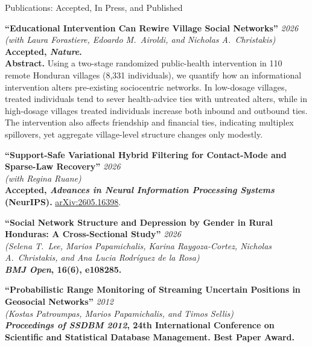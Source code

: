 \documentclass{resume}
\newcommand*{\myhref}[2]{\href{#1}{#2}}
\newcommand{\pubtitle}[1]{\textbf{``#1''}}
\begin{document}
\begin{rSection}{Publications: Accepted, In Press, and Published}

\pubtitle{Educational Intervention Can Rewire Village Social Networks} \hfill {\em 2026}\\
\textit{(with Laura Forastiere, Edoardo M.\ Airoldi, and Nicholas A.\ Christakis)}\\
{\small \textbf{Accepted, \emph{Nature}.}}\\
{\small \textbf{Abstract.} Using a two-stage randomized public-health intervention in 110 remote Honduran villages (8,331 individuals), we quantify how an informational intervention alters pre-existing sociocentric networks. In low-dosage villages, treated individuals tend to sever health-advice ties with untreated alters, while in high-dosage villages treated individuals increase both inbound and outbound ties. The intervention also affects friendship and financial ties, indicating multiplex spillovers, yet aggregate village-level structure changes only modestly.}

\pubtitle{Support-Safe Variational Hybrid Filtering for Contact-Mode and Sparse-Law Recovery} \hfill {\em 2026}\\
\textit{(with Regina Ruane)}\\
{\small \textbf{Accepted, \emph{Advances in Neural Information Processing Systems} (NeurIPS).} \myhref{https://arxiv.org/abs/2605.16398}{arXiv:2605.16398}.}

\pubtitle{Social Network Structure and Depression by Gender in Rural Honduras: A Cross-Sectional Study} \hfill {\em 2026}\\
\textit{(Selena T.\ Lee, Marios Papamichalis, Karina Raygoza-Cortez, Nicholas A.\ Christakis, and Ana Lucia Rodr\'iguez de la Rosa)}\\
{\small \textbf{\emph{BMJ Open}, 16(6), e108285.}}

\pubtitle{Probabilistic Range Monitoring of Streaming Uncertain Positions in Geosocial Networks} \hfill {\em 2012}\\
\textit{(Kostas Patroumpas, Marios Papamichalis, and Timos Sellis)}\\
{\small \textbf{\emph{Proceedings of SSDBM 2012}, 24th International Conference on Scientific and Statistical Database Management. Best Paper Award.}}

\end{rSection}
\end{document}
